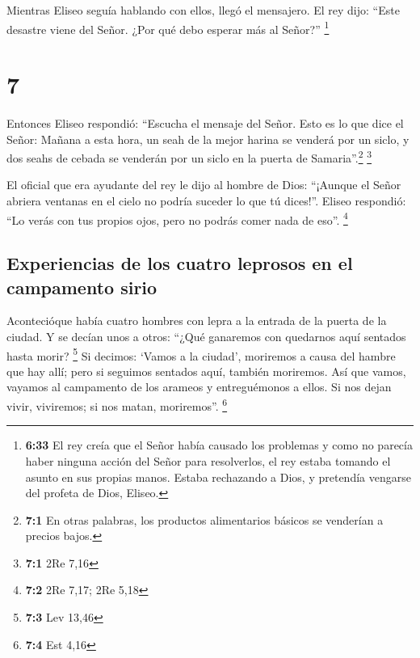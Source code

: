  Mientras Eliseo seguía hablando con ellos, llegó el
mensajero. El rey dijo: ``Este desastre viene del Señor. ¿Por qué debo
esperar más al Señor?'' \footnote{\textbf{6:33} El rey creía que el
  Señor había causado los problemas y como no parecía haber ninguna
  acción del Señor para resolverlos, el rey estaba tomando el asunto en
  sus propias manos. Estaba rechazando a Dios, y pretendía vengarse del
  profeta de Dios, Eliseo.}

\hypertarget{section-6}{%
\section{7}\label{section-6}}

 Entonces Eliseo respondió: ``Escucha el mensaje del
Señor. Esto es lo que dice el Señor: Mañana a esta hora, un seah de la
mejor harina se venderá por un siclo, y dos seahs de cebada se venderán
por un siclo en la puerta de Samaria''.\footnote{\textbf{7:1} En otras
  palabras, los productos alimentarios básicos se venderían a precios
  bajos.} \footnote{\textbf{7:1} 2Re 7,16}

 El oficial que era ayudante del rey le dijo al hombre de
Dios: ``¡Aunque el Señor abriera ventanas en el cielo no podría suceder
lo que tú dices!''. Eliseo respondió: ``Lo verás con tus propios ojos,
pero no podrás comer nada de eso''. \footnote{\textbf{7:2} 2Re 7,17; 2Re
  5,18}

\hypertarget{experiencias-de-los-cuatro-leprosos-en-el-campamento-sirio}{%
\subsection{Experiencias de los cuatro leprosos en el campamento
sirio}\label{experiencias-de-los-cuatro-leprosos-en-el-campamento-sirio}}

 Acontecióque había cuatro hombres con lepra a la entrada
de la puerta de la ciudad. Y se decían unos a otros: ``¿Qué ganaremos
con quedarnos aquí sentados hasta morir? \footnote{\textbf{7:3} Lev
  13,46}  Si decimos: `Vamos a la ciudad', moriremos a
causa del hambre que hay allí; pero si seguimos sentados aquí, también
moriremos. Así que vamos, vayamos al campamento de los arameos y
entreguémonos a ellos. Si nos dejan vivir, viviremos; si nos matan,
moriremos''. \footnote{\textbf{7:4} Est 4,16}

